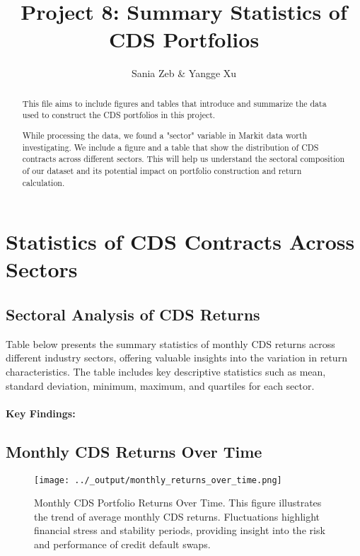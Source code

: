 \documentclass{article}
\title{Project 8: Summary Statistics of CDS Portfolios}
\author{Sania Zeb \& Yangge Xu}
\begin{document}
\maketitle

\begin{abstract}
This file aims to include figures and tables that introduce and summarize the 
data used to construct the CDS portfolios in this project.

While processing the data, we found a "sector" variable in Markit data worth investigating.
We include a figure and a table that show the distribution of CDS contracts across different sectors. 
This will help us understand the sectoral composition of our dataset and its potential impact on portfolio construction and return calculation.
\end{abstract}

\section{Statistics of CDS Contracts Across Sectors}

\subsection{Sectoral Analysis of CDS Returns}

Table below presents the summary statistics of monthly CDS returns across different industry sectors, offering valuable insights into the variation in return characteristics. The table includes key descriptive statistics such as mean, standard deviation, minimum, maximum, and quartiles for each sector.

\paragraph{Key Findings:}

\subsection{Monthly CDS Returns Over Time}
\begin{figure}[H]
    \centering
    \texttt{[image: ../\_output/monthly\_returns\_over\_time.png]}  %
    \caption{\label{fig:monthly_cds_returns} Monthly CDS Portfolio Returns Over Time. 
This figure illustrates the trend of average monthly CDS returns. 
Fluctuations highlight financial stress and stability periods, providing insight into the risk and performance of credit default swaps.}
\end{figure}
\end{document}
